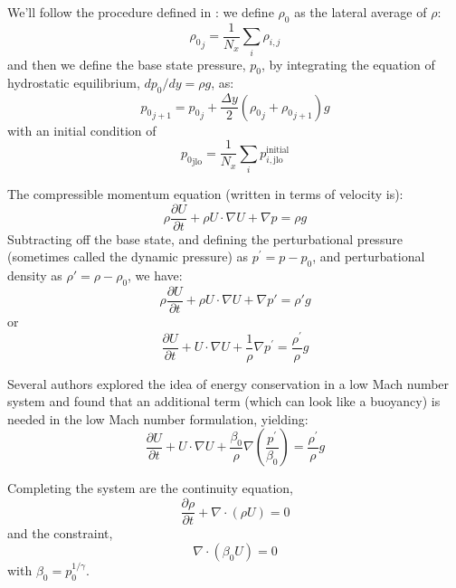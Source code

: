 We'll follow the procedure defined in \cite{multilevel}: we define
$\rho_0$ as the lateral average of $\rho$:
\begin{equation}
{\rho_0}_j = \frac{1}{N_x} \sum_i \rho_{i,j}
\end{equation}
and then we define the base state pressure, $p_0$, by integrating the
equation of hydrostatic equilibrium, $dp_0/dy = \rho g$, as:
\begin{equation}
{p_0}_{j+1} = {p_0}_j + \frac{\Delta y}{2} ({\rho_0}_j + {\rho_0}_{j+1}) g
\end{equation}
with an initial condition of 
\begin{equation}
{p_0}_\mathrm{jlo} = \frac{1}{N_x} \sum_{i} p^\mathrm{initial}_{i,\mathrm{jlo}}
\end{equation}

The compressible momentum equation (written in terms of velocity is):
\begin{equation}
\rho \frac{\partial U}{\partial t} + \rho U \cdot \nabla U + \nabla p = \rho g
\end{equation}
Subtracting off the base state, and defining the perturbational
pressure (sometimes called the dynamic pressure) as $p^\prime = p -
p_0$, and perturbational density as $\rho' = \rho - \rho_0$, we have:
\begin{equation}
\rho \frac{\partial U}{\partial t} + \rho U \cdot \nabla U + \nabla p' = \rho' g
\end{equation}
or 
\begin{equation}
\frac{\partial U}{\partial t} + U \cdot \nabla U + \frac{1}{\rho} \nabla p^\prime = 
   \frac{\rho^\prime}{\rho} g
\end{equation}

Several authors \cite{KP:2012,VLBWZ:2013} explored the idea of energy
conservation in a low Mach number system and found that an additional term (which can
look like a buoyancy) is needed in the low Mach number formulation, yielding:
\begin{equation}
\frac{\partial U}{\partial t} + U \cdot \nabla U + 
   \frac{\beta_0}{\rho} \nabla \left (\frac{p^\prime}{\beta_0} \right ) = 
   \frac{\rho^\prime}{\rho} g
\end{equation}

Completing the system are the continuity equation,
\begin{equation}
\frac{\partial \rho}{\partial t} + \nabla \cdot (\rho U) = 0
\end{equation}
and the constraint,
\begin{equation}
\nabla \cdot (\beta_0 U) = 0
\end{equation}
with $\beta_0 = p_0^{1/\gamma}$.

